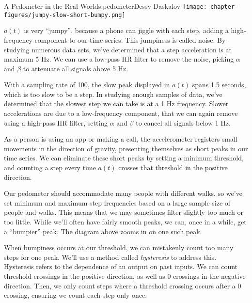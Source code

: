 \begin{aosachapter}{A Pedometer in the Real World}{s:pedometer}{Dessy Daskalov}
\texttt{[image: chapter-figures/jumpy-slow-short-bumpy.png]}\\

\label{jumpy-peaks}

$a(t)$ is very ``jumpy'', because a phone can jiggle with each step,
adding a high-frequency component to our time series. This jumpiness is
called noise. By studying numerous data sets, we've determined that a
step acceleration is at maximum 5 Hz. We can use a low-pass IIR filter
to remove the noise, picking $\alpha$ and $\beta$ to attenuate all
signals above 5 Hz.

\label{slow-peaks}

With a sampling rate of 100, the slow peak displayed in $a(t)$ spans 1.5
seconds, which is too slow to be a step. In studying enough samples of
data, we've determined that the slowest step we can take is at a 1 Hz
frequency. Slower accelerations are due to a low-frequency component,
that we can again remove using a high-pass IIR filter, setting $\alpha$
and $\beta$ to cancel all signals below 1 Hz.

\label{short-peaks}

As a person is using an app or making a call, the accelerometer
registers small movements in the direction of gravity, presenting
themselves as short peaks in our time series. We can eliminate these
short peaks by setting a minimum threshold, and counting a step every
time $a(t)$ crosses that threshold in the positive direction.

\label{bumpy-peaks}

Our pedometer should accommodate many people with different walks, so
we've set minimum and maximum step frequencies based on a large sample
size of people and walks. This means that we may sometimes filter
slightly too much or too little. While we'll often have fairly smooth
peaks, we can, once in a while, get a ``bumpier'' peak. The diagram
above zooms in on one such peak.

When bumpiness occurs at our threshold, we can mistakenly count too many
steps for one peak. We'll use a method called \emph{hysteresis} to
address this. Hysteresis refers to the dependence of an output on past
inputs. We can count threshold crossings in the positive direction, as
well as 0 crossings in the negative direction. Then, we only count steps
where a threshold crossing occurs after a 0 crossing, ensuring we count
each step only once.


\end{aosachapter}
